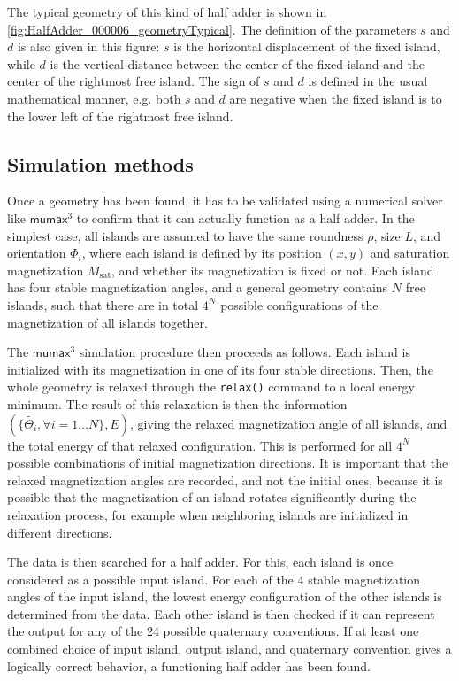 \documentclass[11pt,a4paper,english,twoside]{article}
\newcommand{\code}[1]{\texttt{#1}}
\newcommand{\mumax}{$\mathsf{mumax}^3$}
\begin{document}
The typical geometry of this kind of half adder is shown in \cref{fig:HalfAdder_000006_geometryTypical}. The definition of the parameters $s$ and $d$ is also given in this figure: $s$ is the horizontal displacement of the fixed island, while $d$ is the vertical distance between the center of the fixed island and the center of the rightmost free island. The sign of $s$ and $d$ is defined in the usual mathematical manner, e.g. both $s$ and $d$ are negative when the fixed island is to the lower left of the rightmost free island. \par 

\subsection{Simulation methods}
Once a geometry has been found, it has to be validated using a numerical solver like \mumax{} to confirm that it can actually function as a half adder. In the simplest case, all islands are assumed to have the same roundness $\rho$, size $L$, and orientation $\Phi_i$, where each island is defined by its position $(x,y)$ and saturation magnetization $M_\mathrm{sat}$, and whether its magnetization is fixed or not. Each island has four stable magnetization angles, and a general geometry contains $N$ free islands, such that there are in total $4^N$ possible configurations of the magnetization of all islands together. \par
The \mumax{} simulation procedure then proceeds as follows. Each island is initialized with its magnetization in one of its four stable directions. Then, the whole geometry is relaxed through the \code{relax()} command to a local energy minimum. The result of this relaxation is then the information $(\{\widetilde{\Theta_i}, \forall i=1\dots N\}, E)$, giving the relaxed magnetization angle of all islands, and the total energy of that relaxed configuration. This is performed for all $4^N$ possible combinations of initial magnetization directions. It is important that the relaxed magnetization angles are recorded, and not the initial ones, because it is possible that the magnetization of an island rotates significantly during the relaxation process, for example when neighboring islands are initialized in different directions. \par
The data is then searched for a half adder. For this, each island is once considered as a possible input island. For each of the 4 stable magnetization angles of the input island, the lowest energy configuration of the other islands is determined from the data. Each other island is then checked if it can represent the output for any of the 24 possible quaternary conventions. If at least one combined choice of input island, output island, and quaternary convention gives a logically correct behavior, a functioning half adder has been found. \par
\end{document}
